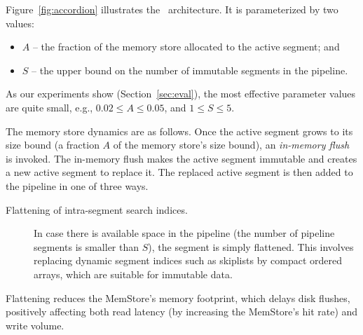  Figure~\ref{fig:accordion} illustrates the \sys\ architecture. It is parameterized by two values:
\begin{itemize}
\item  $A$ -- the fraction of the memory store allocated to the active segment; and 
\item $S$ -- the upper bound on the number of immutable segments in the pipeline. 
\end{itemize}

\noindent
As our experiments show (Section~\ref{sec:eval}), the most effective parameter values are quite small, 
e.g., $0.02 \leq A \leq 0.05$, and $1 \leq S \leq 5$.

The memory store dynamics are as follows. 
Once the active segment grows to its size bound (a fraction $A$ of the memory store's size bound), an \emph{in-memory flush} is invoked.
The in-memory flush makes the active segment immutable and creates a new active segment to replace it. 
The replaced active segment is then added to the pipeline in one of three ways. 
\begin{description}
\item[Flattening of intra-segment search indices.] 
In case there is available space in the pipeline (the number of pipeline segments is smaller than $S$), 
the segment is simply flattened. This involves replacing dynamic segment indices such as skiplists by 
compact ordered arrays, which are suitable for immutable data. 
\end{description}
Flattening reduces the MemStore's memory footprint, which delays  disk flushes, positively affecting both read latency  (by increasing the MemStore's hit rate) and write volume.

